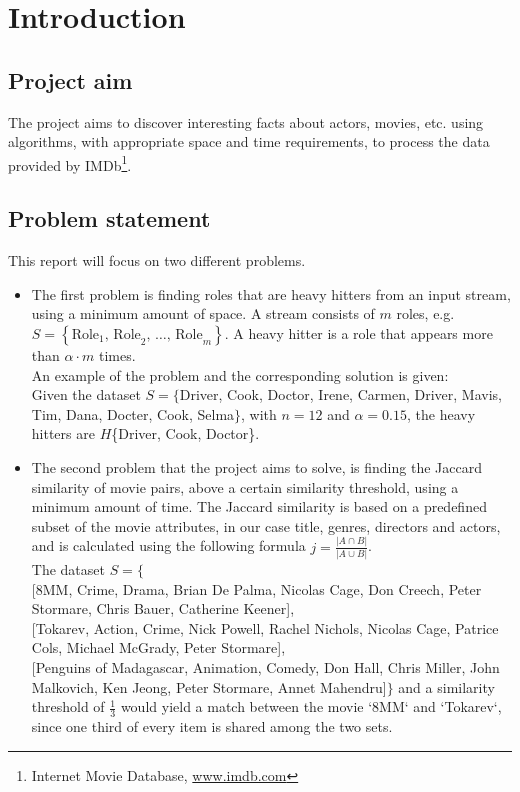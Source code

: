 
\section{Introduction}

\subsection{Project aim}
The project aims to discover interesting facts about actors, movies, etc. using algorithms, with appropriate space and time requirements, to process the data provided by IMDb\footnote{Internet Movie Database, \url{www.imdb.com}}.

\subsection{Problem statement}
\label{sub:problem}
	This report will focus on two different problems.
\begin{itemize}
	\item The first problem is finding roles that are heavy hitters from an input stream, using a minimum amount of space. A stream consists of \(m\) roles, e.g. \(S=\left\{\textrm{Role}_1 \textrm{, Role}_2 \textrm{, } \dots \textrm{, Role}_m\right\}\). A heavy hitter is a role that appears more than \(\alpha \cdot m\) times.\\
	An example of the problem and the corresponding solution is given: \\
	Given the dataset \(S = \{\)Driver, Cook, Doctor, Irene, Carmen, Driver, Mavis, Tim, Dana, Docter, Cook, Selma\(\}\), with \(n=12\) and \(\alpha=0.15\), the heavy hitters are \(H\)\{Driver, Cook, Doctor\}.
	\item The second problem that the project aims to solve, is finding the Jaccard similarity of movie pairs, above a certain similarity threshold, using a minimum amount of time. The Jaccard similarity is based on a predefined subset of the movie attributes, in our case title, genres, directors and actors, and is calculated using the following formula \(j = \frac{|A \cap B|}{|A \cup B|}\). \\
	The dataset \(S = \{\) \\
		{[}8MM, Crime, Drama, Brian De Palma, Nicolas Cage, Don Creech, Peter Stormare, Chris Bauer, Catherine Keener{]}, \\
		{[}Tokarev, Action, Crime, Nick Powell, Rachel Nichols, Nicolas Cage, Patrice Cols, Michael McGrady, Peter Stormare{]}, \\
		{[}Penguins of Madagascar, Animation, Comedy, Don Hall, Chris Miller, John Malkovich, Ken Jeong, Peter Stormare, Annet Mahendru{]}\(\}\)
	and a similarity threshold of \(\frac{1}{3}\) would yield a match between the movie `8MM` and `Tokarev`, since one third of every item is shared among the two sets.
	
\end{itemize}

